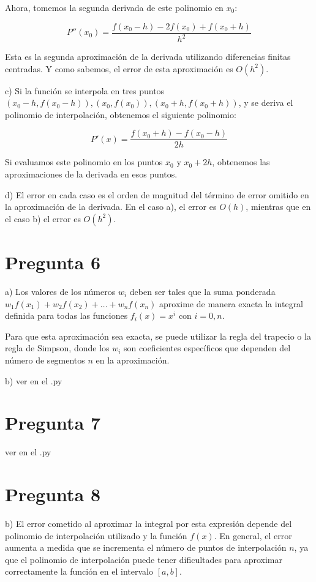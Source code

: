 \documentclass[a4paper,12pt]{article}
\begin{document}
Ahora, tomemos la segunda derivada de este polinomio en \( x_0 \):

\[ P''(x_0) = \frac{f(x_0 - h) - 2f(x_0) + f(x_0 + h)}{h^2} \]

Esta es la segunda aproximación de la derivada utilizando diferencias finitas centradas. Y como sabemos, el error de esta aproximación es \( O(h^2) \).

c) Si la función se interpola en tres puntos \( (x_0 - h, f(x_0 - h)), (x_0, f(x_0)), (x_0 + h, f(x_0 + h)) \), y se deriva el polinomio de interpolación, obtenemos el siguiente polinomio:

\[ P'(x) = \frac{f(x_0 + h) - f(x_0 - h)}{2h} \]

Si evaluamos este polinomio en los puntos \( x_0 \) y \( x_0 + 2h \), obtenemos las aproximaciones de la derivada en esos puntos.

d) El error en cada caso es el orden de magnitud del término de error omitido en la aproximación de la derivada. En el caso a), el error es \( O(h) \), mientras que en el caso b) el error es \( O(h^2) \).

\section*{Pregunta 6}

a) Los valores de los números \( w_i \) deben ser tales que la suma ponderada \( w_1 f(x_1) + w_2 f(x_2) + \ldots + w_n f(x_n) \) aproxime de manera exacta la integral definida para todas las funciones \( f_i(x) = x^i \) con \( i = 0, n \). 

Para que esta aproximación sea exacta, se puede utilizar la regla del trapecio o la regla de Simpson, donde los \( w_i \) son coeficientes específicos que dependen del número de segmentos \( n \) en la aproximación.

b) ver en el .py
\section*{Pregunta 7}
ver en el .py
\section*{Pregunta 8}
b) El error cometido al aproximar la integral por esta expresión depende del polinomio de interpolación utilizado y la función \( f(x) \). En general, el error aumenta a medida que se incrementa el número de puntos de interpolación \( n \), ya que el polinomio de interpolación puede tener dificultades para aproximar correctamente la función en el intervalo \([a, b]\).
\end{document}
